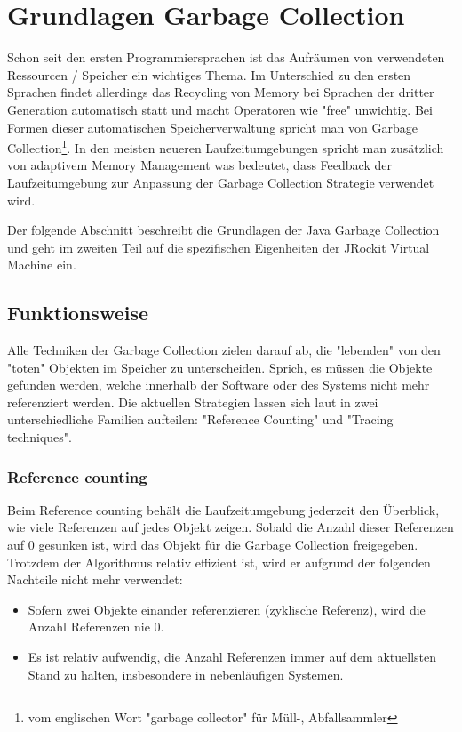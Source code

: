 \chapter{Grundlagen Garbage Collection}
Schon seit den ersten Programmiersprachen ist das Aufräumen von verwendeten Ressourcen / Speicher ein wichtiges Thema. Im Unterschied zu den ersten Sprachen findet allerdings das Recycling von Memory bei Sprachen der dritter Generation automatisch statt und macht Operatoren wie "free" unwichtig. Bei Formen dieser automatischen Speicherverwaltung spricht man von Garbage Collection\footnote{vom englischen Wort "garbage collector" für Müll-, Abfallsammler}. In den meisten neueren Laufzeitumgebungen spricht man zusätzlich von adaptivem Memory Management was bedeutet, dass Feedback der Laufzeitumgebung zur Anpassung der Garbage Collection Strategie verwendet wird.

Der folgende Abschnitt beschreibt die Grundlagen der Java Garbage Collection und geht im zweiten Teil auf die spezifischen Eigenheiten der JRockit Virtual Machine ein.

\section{Funktionsweise}
Alle Techniken der Garbage Collection zielen darauf ab, die "lebenden" von den "toten" Objekten im Speicher zu unterscheiden. Sprich, es müssen die Objekte gefunden werden, welche innerhalb der Software oder des Systems nicht mehr referenziert werden. Die aktuellen Strategien lassen sich laut\cite[S. 77]{lagergren2010oracle} in zwei unterschiedliche Familien aufteilen: "Reference Counting" und "Tracing techniques".

\subsection{Reference counting\cite[S. 77]{lagergren2010oracle}}
Beim Reference counting behält die Laufzeitumgebung jederzeit den Überblick, wie viele Referenzen auf jedes Objekt zeigen. Sobald die Anzahl dieser Referenzen auf 0 gesunken ist, wird das Objekt für die Garbage Collection freigegeben. Trotzdem der Algorithmus relativ effizient ist, wird er aufgrund der folgenden Nachteile nicht mehr verwendet:
\begin{itemize}
	\item Sofern zwei Objekte einander referenzieren (zyklische Referenz), wird die Anzahl Referenzen nie 0.
	\item Es ist relativ aufwendig, die Anzahl Referenzen immer auf dem aktuellsten Stand zu halten, insbesondere in nebenläufigen Systemen.
\end{itemize}

